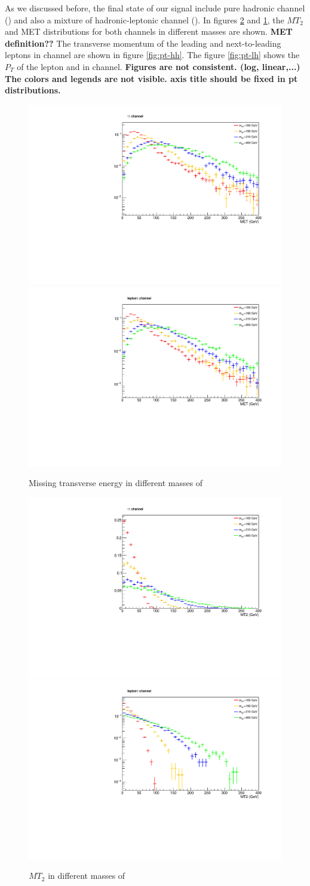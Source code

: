 As we discussed before, the final state of our signal include pure hadronic channel (\tauTau) and also a mixture of hadronic-leptonic channel (\lepTau ).  In figures \ref{fig:mt2} and \ref{fig:met}, the $MT_2$ and MET distributions for both channels in different \wprime masses are shown.
{\bf MET definition??} The transverse momentum of the leading and next-to-leading \Tau leptons in \tauTau channel are shown in figure \ref{fig:pt-hh}. The figure \ref{fig:pt-lh} shows the $P_T$ of the lepton and \Tau in \lepTau channel.
{\bf Figures are not consistent. (log, linear,...) The colors and legends are not visible. axis title should be fixed in pt distributions.}
\begin{figure}[!ht]
\centering
\includegraphics*[width=.45\textwidth]{figs/MET-hh.pdf}
\hspace{3mm}
\includegraphics*[width=.45\textwidth]{figs/MET-lh.pdf}
\caption{Missing transverse energy in different masses of \wprime }
\label{fig:met}
\end{figure}
\begin{figure}[htb]
\centering
\includegraphics*[width=.45\textwidth]{figs/MT2-hh.pdf}
\hspace{3mm}
\includegraphics*[width=.45\textwidth]{figs/MT2-lh.pdf}
\caption{$MT_2$ in different masses of \wprime }
\label{fig:mt2}
\end{figure} 
